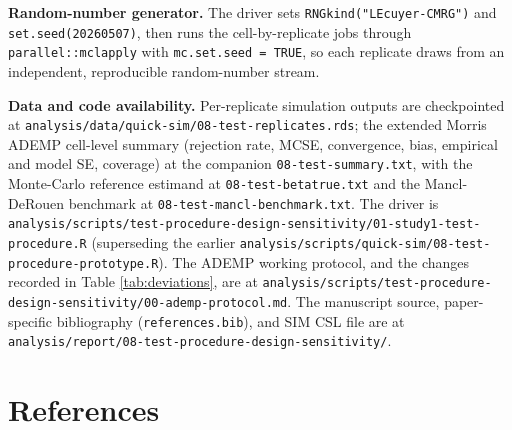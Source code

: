 \documentclass[
  11pt,
]{article}
\begin{document}
\textbf{Random-number generator.} The driver sets
\texttt{RNGkind("L\textquotesingle{}Ecuyer-CMRG")} and \texttt{set.seed(20260507)}, then runs
the cell-by-replicate jobs through \texttt{parallel::mclapply} with
\texttt{mc.set.seed\ =\ TRUE}, so each replicate draws from an
independent, reproducible random-number stream.

\textbf{Data and code availability.} Per-replicate simulation outputs
are checkpointed at
\texttt{analysis/data/quick-sim/08-test-replicates.rds}; the extended
Morris ADEMP cell-level summary (rejection rate, MCSE,
convergence, bias, empirical and model SE, coverage) at the
companion \texttt{08-test-summary.txt}, with the Monte-Carlo reference
estimand at \texttt{08-test-betatrue.txt} and the Mancl-DeRouen
benchmark at \texttt{08-test-mancl-benchmark.txt}. The driver is
\texttt{analysis/scripts/test-procedure-design-sensitivity/01-study1-test-procedure.R}
(superseding the earlier
\texttt{analysis/scripts/quick-sim/08-test-procedure-prototype.R}). The
ADEMP working protocol, and the changes recorded in Table
\ref{tab:deviations}, are at
\texttt{analysis/scripts/test-procedure-design-sensitivity/00-ademp-protocol.md}.
The manuscript source, paper-specific bibliography
(\texttt{references.bib}), and SIM CSL file are at
\texttt{analysis/report/08-test-procedure-design-sensitivity/}.

\section{References}\label{references}
\end{document}
